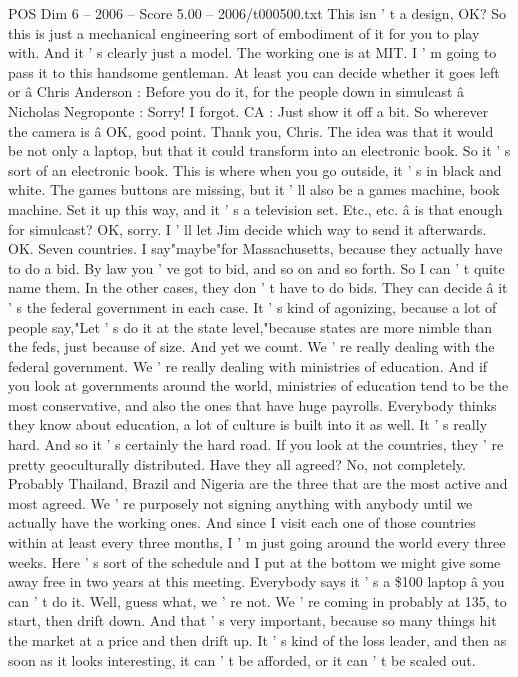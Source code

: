 \begin{textsample}{POS Dim 6 – 2006 – Score 5.00 – 2006/t000500.txt}
This isn ' t a design, OK?
So this is just a mechanical engineering sort of embodiment of it for you to play with.
And it ' s clearly just a model.
The working one is at MIT.
I ' m going to pass it to this handsome gentleman.
At least you can decide whether it goes left or â Chris Anderson : Before you do it, for the people down in simulcast â Nicholas Negroponte : Sorry!
I forgot.
CA : Just show it off a bit.
So wherever the camera is â OK, good point.
Thank you, Chris.
The idea was that it would be not only a laptop, but that it could transform into an electronic book.
So it ' s sort of an electronic book.
This is where when you go outside, it ' s in black and white.
The games buttons are missing, but it ' ll also be a games machine, book machine.
Set it up this way, and it ' s a television set.
Etc., etc. â is that enough for simulcast?
OK, sorry.
I ' ll let Jim decide which way to send it afterwards.
OK.
Seven countries.
I say"maybe"for Massachusetts, because they actually have to do a bid.
By law you ' ve got to bid, and so on and so forth.
So I can ' t quite name them.
In the other cases, they don ' t have to do bids.
They can decide â it ' s the federal government in each case.
It ' s kind of agonizing, because a lot of people say,"Let ' s do it at the state level,"because states are more nimble than the feds, just because of size.
And yet we count.
We ' re really dealing with the federal government.
We ' re really dealing with ministries of education.
And if you look at governments around the world, ministries of education tend to be the most conservative, and also the ones that have huge payrolls.
Everybody thinks they know about education, a lot of culture is built into it as well.
It ' s really hard.
And so it ' s certainly the hard road.
If you look at the countries, they ' re pretty geoculturally distributed.
Have they all agreed?
No, not completely.
Probably Thailand, Brazil and Nigeria are the three that are the most active and most agreed.
We ' re purposely not signing anything with anybody until we actually have the working ones.
And since I visit each one of those countries within at least every three months, I ' m just going around the world every three weeks.
Here ' s sort of the schedule and I put at the bottom we might give some away free in two years at this meeting.
Everybody says it ' s a \$100 laptop â you can ' t do it.
Well, guess what, we ' re not.
We ' re coming in probably at 135, to start, then drift down.
And that ' s very important, because so many things hit the market at a price and then drift up.
It ' s kind of the loss leader, and then as soon as it looks interesting, it can ' t be afforded, or it can ' t be scaled out.

\end{textsample}
